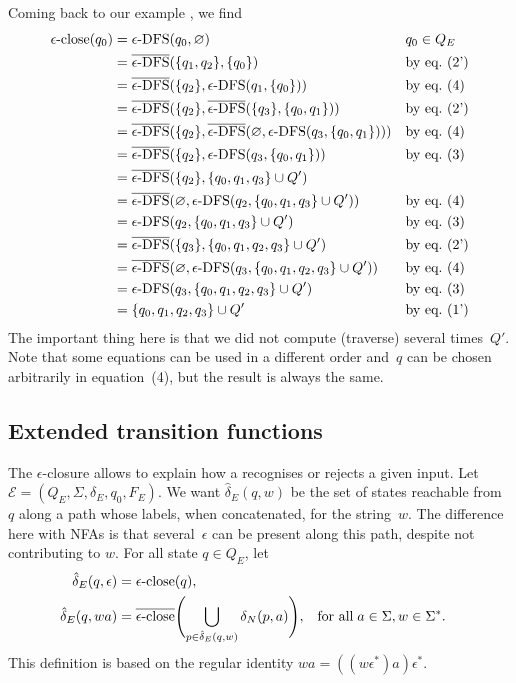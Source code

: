 Coming back to our example , we find
\begin{align*}
   \epsilon\text{-close} (q_0)
&= \epsilon\text{-DFS} (q_0, \varnothing)
&& q_0 \in Q_E\\
&= \overline{\epsilon\text{-DFS}} (\{q_1, q_2\}, \{q_0\})
&& \text{by eq.~(2')}\\
&= \overline{\epsilon\text{-DFS}} (\{q_2\}, \epsilon\text{-DFS} (q_1, \{q_0\}))
&& \text{by eq.~(4)}\\
&= \overline{\epsilon\text{-DFS}} (\{q_2\}, \overline{\epsilon\text{-DFS}} (\{q_3\}, \{q_0,
   q_1\}))
&& \text{by eq.~(2')}\\
&= \overline{\epsilon\text{-DFS}} (\{q_2\}, \overline{\epsilon\text{-DFS}} (\varnothing, \epsilon\text{-DFS} (q_3, \{q_0, q_1\})))
&& \text{by eq.~(4)}\\
&= \overline{\epsilon\text{-DFS}} (\{q_2\}, \epsilon\text{-DFS} (q_3, \{q_0, q_1\}))
&& \text{by eq.~(3)}\\
&= \overline{\epsilon\text{-DFS}} (\{q_2\}, \{q_0, q_1, q_3\} \cup Q')\\
&= \overline{\epsilon\text{-DFS}} (\varnothing, \epsilon\text{-DFS} (q_2, \{q_0, q_1, q_3\} \cup Q'))
&& \text{by eq.~(4)}\\
&= \epsilon\text{-DFS} (q_2, \{q_0, q_1, q_3\} \cup Q')
&& \text{by eq.~(3)}\\
&= \overline{\epsilon\text{-DFS}} (\{q_3\}, \{q_0, q_1, q_2, q_3\} \cup Q')
&& \text{by eq.~(2')}\\
&= \overline{\epsilon\text{-DFS}} (\varnothing, \epsilon\text{-DFS} (q_3, \{q_0, q_1, q_2, q_3\} \cup Q'))
&& \text{by eq.~(4)}\\
&= \epsilon\text{-DFS} (q_3, \{q_0, q_1, q_2, q_3\} \cup Q')
&& \text{by eq.~(3)}\\
&= \{q_0, q_1, q_2, q_3\} \cup Q'
&& \text{by eq.~(1')}\\
\end{align*}
The important thing here is that we did not compute (traverse) several
times~\(Q'\). Note that some equations can be used in a different
order and~\(q\) can be chosen arbitrarily in equation~(4), but the
result is always the same.

\subsection*{Extended transition functions}

The \(\epsilon\)-closure allows to explain how a \eNFA recognises or
rejects a given input. Let \(\mathcal{E} = (Q_E, \Sigma, \delta_E,
q_0, F_E)\). We want \(\hat{\delta}_E (q, w)\) be the set of states
reachable from~\(q\) along a path whose labels, when concatenated, for
the string~\(w\). The difference here with NFAs is that
several~\(\epsilon\) can be present along this path, despite not
contributing to \(w\).  For all state \(q \in Q_E\), let
\begin{align*}
   \hat{\delta}_E (q, \epsilon)
&= \epsilon\text{-close} (q),\\
   \hat{\delta}_E (q, wa)
&= \overline{\epsilon\text{-close}} \Biggl(\bigcup_{p \in \hat{\delta}_E (q, w)}{\delta_N (p,
     a)}\Biggr),
&& \text{for all} \; a \in \Sigma, w \in \Sigma^{*}.
\end{align*}
This definition is based on the regular identity \(wa =
((w\epsilon^{*})a)\epsilon^{*}\).

